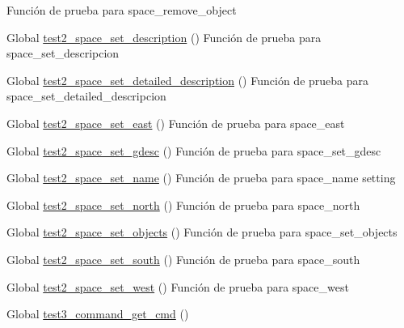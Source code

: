 \begin{DoxyRefList}
%
Función de prueba para space\+\_\+remove\+\_\+object  
\item[Global \mbox{\hyperlink{space__test_8c_ab3dd07cbead60f87866e2bd2c426da0f}{test2\+\_\+space\+\_\+set\+\_\+description}} ()]\label{test__test000259}%
%
Función de prueba para space\+\_\+set\+\_\+descripcion  
\item[Global \mbox{\hyperlink{space__test_8c_a4a5d16476783f31bda040a95fe0cf825}{test2\+\_\+space\+\_\+set\+\_\+detailed\+\_\+description}} ()]\label{test__test000264}%
%
Función de prueba para space\+\_\+set\+\_\+detailed\+\_\+descripcion  
\item[Global \mbox{\hyperlink{space__test_8c_a5df66d103388be4518c379b224f53770}{test2\+\_\+space\+\_\+set\+\_\+east}} ()]\label{test__test000230}%
%
Función de prueba para space\+\_\+east  
\item[Global \mbox{\hyperlink{space__test_8c_af40c7a664b529a39c3d98dca3d0af708}{test2\+\_\+space\+\_\+set\+\_\+gdesc}} ()]\label{test__test000255}%
%
Función de prueba para space\+\_\+set\+\_\+gdesc  
\item[Global \mbox{\hyperlink{space__test_8c_a5a868ba017602ba6b58447cb394e81a6}{test2\+\_\+space\+\_\+set\+\_\+name}} ()]\label{test__test000223}%
%
Función de prueba para space\+\_\+name setting  
\item[Global \mbox{\hyperlink{space__test_8c_a3bc7fe26c1e36ffd195099a9983206e1}{test2\+\_\+space\+\_\+set\+\_\+north}} ()]\label{test__test000226}%
%
Función de prueba para space\+\_\+north  
\item[Global \mbox{\hyperlink{space__test_8c_a99e0332138058605da0cc6e631e7aa75}{test2\+\_\+space\+\_\+set\+\_\+objects}} ()]\label{test__test000236}%
%
Función de prueba para space\+\_\+set\+\_\+objects  
\item[Global \mbox{\hyperlink{space__test_8c_ac9f950741f12ccfcc5ad5d9e71d3d90a}{test2\+\_\+space\+\_\+set\+\_\+south}} ()]\label{test__test000228}%
%
Función de prueba para space\+\_\+south  
\item[Global \mbox{\hyperlink{space__test_8c_aa51b05ffd99b7bbd8f2dfc23c8f85870}{test2\+\_\+space\+\_\+set\+\_\+west}} ()]\label{test__test000232}%
%
Función de prueba para space\+\_\+west  
\item[Global \mbox{\hyperlink{command__test_8c_a41e0413cb7402808064a47e714418b0e}{test3\+\_\+command\+\_\+get\+\_\+cmd}} ()]\label{test__test000015}%

\end{DoxyRefList}
